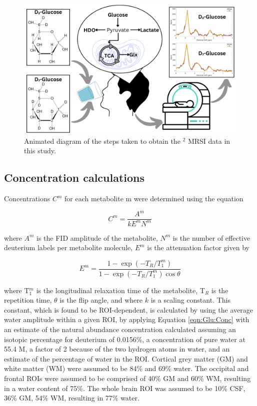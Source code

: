 \documentclass[class=article, crop=false]{standalone}
\begin{document}
\begin{figure}
    \centering
    \includegraphics[width = 1\textwidth]{Figures/Glucose/Study_Day.png}
    \caption{Animated diagram of the steps taken to obtain the $^2$ MRSI data in this study.}
    \label{fig:Glu:Study_Day}
\end{figure}

\subsection{Concentration calculations}

Concentrations $C^m$ for each metabolite m were determined using the equation

\begin{equation}
    C^m = \frac{A^m}{kE^mN^m}
    \label{eqn:Glu:Conc}
\end{equation}

where $A^m$ is the FID amplitude of the metabolite, $N^m$ is the number of effective deuterium labels per metabolite molecule, $E^m$ is the attenuation factor given by

\begin{equation}
    E^m = \frac{1-\exp(-T_R/T_1^m)}{1-\exp(-T_R/T_1^m)\cos{\theta}}
    \label{eqn:Glu:Atte}
\end{equation}

where T$_1^m$ is the longitudinal relaxation time of the metabolite, T$_R$ is the repetition time, $\theta$ is the flip angle, and where $k$ is a scaling constant. This constant, which is found to be ROI-dependent, is calculated by using the average water amplitude within a given ROI, by applying Equation \ref{eqn:Glu:Conc} with an estimate of the natural abundance concentration calculated assuming an isotopic percentage for deuterium of 0.0156\%\cite{Hagemann1970AbsoluteSMOW}, a concentration of pure water at 55.4 M, a factor of 2 because of the two hydrogen atoms in water, and an estimate of the percentage of water in the ROI. Cortical grey matter (GM) and white matter (WM) were assumed to be 84\% and 69\% water\cite{Oros-Peusquens2019AImplications}. The occipital and frontal ROIs were assumed to be comprised of 40\% GM and 60\% WM, resulting in a water content of 75\%. The whole brain ROI was assumed to be 10\% CSF, 36\% GM, 54\% WM, resulting in 77\% water.
\end{document}
